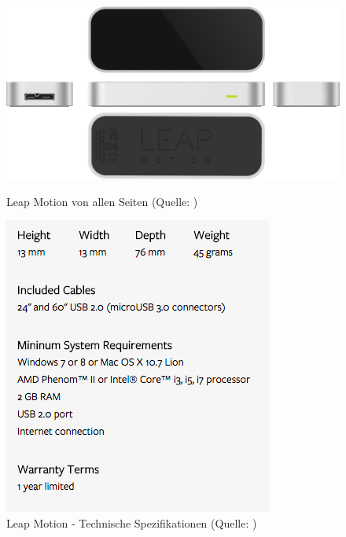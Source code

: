 \begin{figure}[H]
  \begin{minipage}[b]{0.5\linewidth}
    \centering
   	\includegraphics[width=1.0\linewidth]{images/analysis/leap_360_view.png}
   	\caption[Leap Motion von allen Seiten]{Leap Motion von allen Seiten (Quelle: )}
  \end{minipage}%
  \hspace{.1\linewidth}
  \begin{minipage}[b]{0.4\linewidth}
    \centering
	\includegraphics[width=1.0\linewidth]{images/analysis/leap_technical_specifiaction.png}
	\caption[Leap Motion - Technische Spezifikationen]{Leap Motion - Technische Spezifikationen (Quelle: )}
  \end{minipage}
\end{figure}

